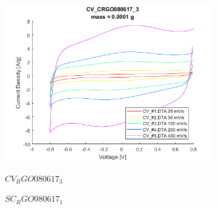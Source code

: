 \begin{figure}
{\begin{subfigure}[t]{0.3\textwidth}
{				\includegraphics[width=\textwidth]{./Data/CV_CRGO080617_3.png}
			}
			\caption{$CV_RGO080617_3$}
			\label{fig:CV_RGO080617_3}
		\end{subfigure}
	\medskip
		\begin{subfigure}[t]{0.3\textwidth}		
			\caption{$SC_RGO080617_1$}
			\label{fig:SC_RGO080617_1}
		\end{subfigure}\hfill
		\begin{subfigure}[t]{0.3\textwidth}	
			\fbox{
}
\end{subfigure}}
\end{figure}
